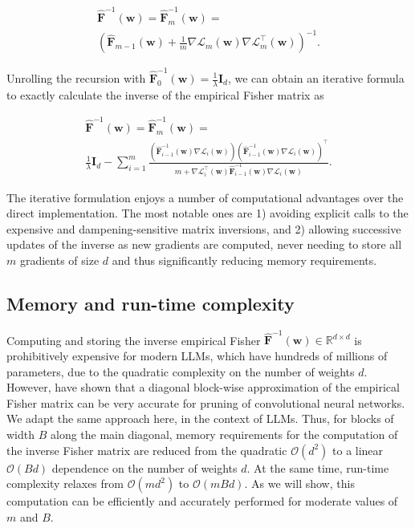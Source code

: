 \documentclass[11pt]{article}
\newcommand{\vect}[1]{\mathbf{#1}}
\newcommand{\w}{\mathbf{w}}
\newcommand{\pr}[1]{\left(#1\right)}
\newcommand{\eF}{\widehat{\vect{F}}}
\begin{document}
\begin{eqnarray*}
    & \eF^{-1}(\w) = \eF^{-1}_m(\w) = \\ & \pr{\eF_{m-1}(\w) + \frac{1}{m} \nabla \mathcal{L}_m(\w) \nabla \mathcal{L}_m^\top(\w)}^{-1}. &
\end{eqnarray*}

\noindent Unrolling the recursion with $\eF^{-1}_0(\w) = \frac{1}{\lambda} \vect{I}_d$, we can obtain an iterative formula to exactly calculate the inverse of the empirical Fisher matrix as

\begin{eqnarray*}
\label{eq:iterative}
    & \eF^{-1}(\w) =  \eF^{-1}_m(\w) = \\ & \frac{1}{\lambda} \vect{I}_d - \sum_{i=1}^{m} \frac{\pr{\eF^{-1}_{i-1}(\w) \nabla \mathcal{L}_i(\w)}\pr{\eF^{-1}_{i-1}(\w) \nabla \mathcal{L}_i(\w)}^\top}{m + \nabla \mathcal{L}_i^\top(\w) \eF^{-1}_{i-1}(\w) \nabla \mathcal{L}_i(\w)}. &
\end{eqnarray*}

The iterative formulation enjoys a number of computational advantages over the direct implementation. The most notable ones are 1) avoiding explicit calls to the expensive and dampening-sensitive matrix inversions, and 2) allowing successive updates of the inverse as new gradients are computed, never needing to store all $m$ gradients of size $d$ and thus significantly reducing memory requirements. 

\subsection{Memory and run-time complexity}

Computing and storing the inverse empirical Fisher $\eF^{-1}(\w) \in \mathbb{R}^{d \times d}$ is prohibitively expensive for modern LLMs, which have hundreds of millions of parameters, due to the quadratic complexity on the number of weights $d$. However, \citet{Singh2020WoodFisherES} have shown that a diagonal block-wise approximation of the empirical Fisher matrix can be very accurate for pruning of convolutional neural networks.  We adapt the same approach here, in the context of LLMs. Thus, for blocks of width $B$ along the main diagonal, memory requirements for the computation of the inverse Fisher matrix are reduced from the quadratic $\mathcal{O}(d^2)$ to a linear $\mathcal{O}(Bd)$ dependence on the number of weights $d$. At the same time, run-time complexity relaxes from $\mathcal{O}(md^2)$ to $\mathcal{O}(mBd)$. 
As we will show, this computation can be efficiently and accurately performed for moderate values of $m$ and $B$. 
\end{document}
